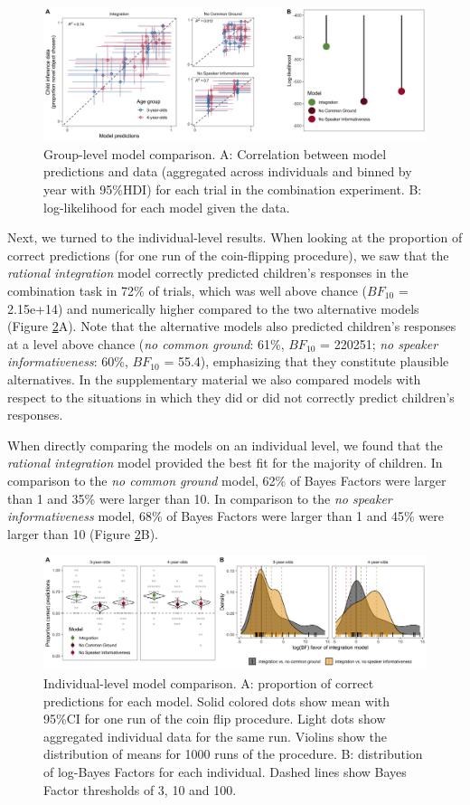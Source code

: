 \documentclass[
  man,floatsintext]{apa6}
\begin{document}
\begin{figure}
\includegraphics[width=1\linewidth]{./figures/fig3} \caption{Group-level model comparison. A: Correlation between model predictions and data (aggregated across individuals and binned by year with 95\%HDI) for each trial in the combination experiment. B: log-likelihood for each model given the data.}\label{fig:fig3}
\end{figure}

Next, we turned to the individual-level results. When looking at the proportion of correct predictions (for one run of the coin-flipping procedure), we saw that the \emph{rational integration} model correctly predicted children's responses in the combination task in 72\% of trials, which was well above chance (\(BF_{10}\) = 2.15e+14) and numerically higher compared to the two alternative models (Figure \ref{fig:fig4}A). Note that the alternative models also predicted children's responses at a level above chance (\emph{no common ground}: 61\%, \(BF_{10}\) = 220251; \emph{no speaker informativeness}: 60\%, \(BF_{10}\) = 55.4), emphasizing that they constitute plausible alternatives. In the supplementary material we also compared models with respect to the situations in which they did or did not correctly predict children's responses.

When directly comparing the models on an individual level, we found that the \emph{rational integration} model provided the best fit for the majority of children. In comparison to the \emph{no common ground} model, 62\% of Bayes Factors were larger than 1 and 35\% were larger than 10. In comparison to the \emph{no speaker informativeness} model, 68\% of Bayes Factors were larger than 1 and 45\% were larger than 10 (Figure \ref{fig:fig4}B).

\begin{figure}
\includegraphics[width=1\linewidth]{./figures/fig4} \caption{Individual-level model comparison. A: proportion of correct predictions for each model. Solid colored dots show mean with 95\%CI for one run of the coin flip procedure. Light dots show aggregated individual data for the same run. Violins show the distribution of means for 1000 runs of the procedure. B: distribution of log-Bayes Factors for each individual. Dashed lines show Bayes Factor thresholds of 3, 10 and 100.}\label{fig:fig4}
\end{figure}
\end{document}

